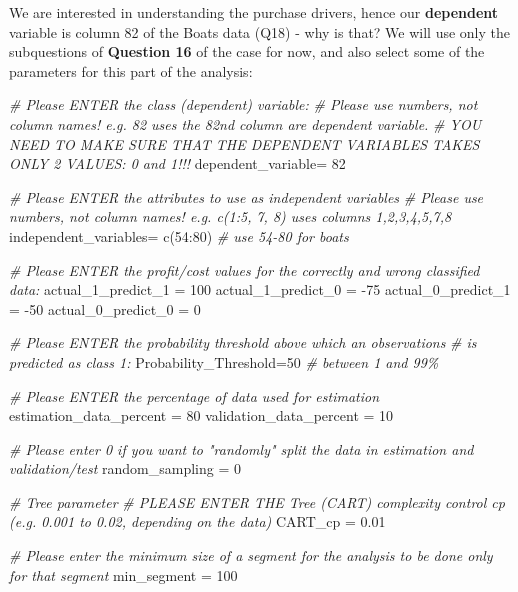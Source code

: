\documentclass[
]{article}
\newenvironment{Shaded}{\begin{snugshade}}{\end{snugshade}}
\newcommand{\CommentTok}[1]{\textcolor[rgb]{0.56,0.35,0.01}{\textit{#1}}}
\newcommand{\DecValTok}[1]{\textcolor[rgb]{0.00,0.00,0.81}{#1}}
\newcommand{\FloatTok}[1]{\textcolor[rgb]{0.00,0.00,0.81}{#1}}
\newcommand{\FunctionTok}[1]{\textcolor[rgb]{0.00,0.00,0.00}{#1}}
\newcommand{\NormalTok}[1]{#1}
\newcommand{\OtherTok}[1]{\textcolor[rgb]{0.56,0.35,0.01}{#1}}
\newcommand{\SpecialCharTok}[1]{\textcolor[rgb]{0.00,0.00,0.00}{#1}}
\begin{document}
We are interested in understanding the purchase drivers, hence our
\textbf{dependent} variable is column 82 of the Boats data (Q18) - why
is that? We will use only the subquestions of \textbf{Question 16} of
the case for now, and also select some of the parameters for this part
of the analysis:

\begin{Shaded}
\begin{Highlighting}[]
\CommentTok{\# Please ENTER the class (dependent) variable:}
\CommentTok{\# Please use numbers, not column names! e.g. 82 uses the 82nd column are dependent variable.}
\CommentTok{\# YOU NEED TO MAKE SURE THAT THE DEPENDENT VARIABLES TAKES ONLY 2 VALUES: 0 and 1!!!}
\NormalTok{dependent\_variable}\OtherTok{=} \DecValTok{82}

\CommentTok{\# Please ENTER the attributes to use as independent variables }
\CommentTok{\# Please use numbers, not column names! e.g. c(1:5, 7, 8) uses columns 1,2,3,4,5,7,8}
\NormalTok{independent\_variables}\OtherTok{=} \FunctionTok{c}\NormalTok{(}\DecValTok{54}\SpecialCharTok{:}\DecValTok{80}\NormalTok{) }\CommentTok{\# use 54{-}80 for boats}

\CommentTok{\# Please ENTER the profit/cost values for the correctly and wrong classified data:}
\NormalTok{actual\_1\_predict\_1 }\OtherTok{=} \DecValTok{100}
\NormalTok{actual\_1\_predict\_0 }\OtherTok{=} \SpecialCharTok{{-}}\DecValTok{75}
\NormalTok{actual\_0\_predict\_1 }\OtherTok{=} \SpecialCharTok{{-}}\DecValTok{50}
\NormalTok{actual\_0\_predict\_0 }\OtherTok{=} \DecValTok{0}

\CommentTok{\# Please ENTER the probability threshold above which an observations  }
\CommentTok{\# is predicted as class 1:}
\NormalTok{Probability\_Threshold}\OtherTok{=}\DecValTok{50} \CommentTok{\# between 1 and 99\%}

\CommentTok{\# Please ENTER the percentage of data used for estimation}
\NormalTok{estimation\_data\_percent }\OtherTok{=} \DecValTok{80}
\NormalTok{validation\_data\_percent }\OtherTok{=} \DecValTok{10}

\CommentTok{\# Please enter 0 if you want to "randomly" split the data in estimation and validation/test}
\NormalTok{random\_sampling }\OtherTok{=} \DecValTok{0}

\CommentTok{\# Tree parameter}
\CommentTok{\# PLEASE ENTER THE Tree (CART) complexity control cp (e.g. 0.001 to 0.02, depending on the data)}
\NormalTok{CART\_cp }\OtherTok{=} \FloatTok{0.01}

\CommentTok{\# Please enter the minimum size of a segment for the analysis to be done only for that segment}
\NormalTok{min\_segment }\OtherTok{=} \DecValTok{100}
\end{Highlighting}
\end{Shaded}
\end{document}
